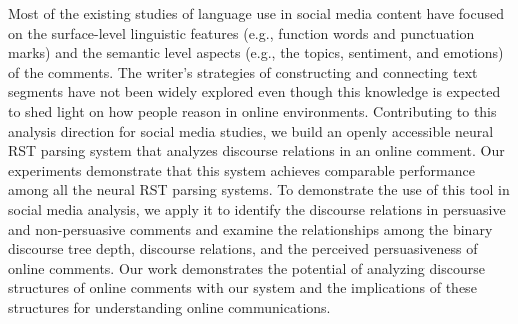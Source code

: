 Most of the existing studies of language use in social media content have focused on the surface-level linguistic features (e.g., function words and punctuation marks) and the semantic level aspects (e.g., the topics, sentiment, and emotions) of the comments. The writer's strategies of constructing and connecting text segments have not been widely explored even though this knowledge is expected to shed light on how people reason in online environments. Contributing to this analysis direction for social media studies, we build an openly accessible neural RST parsing system that analyzes discourse relations in an online comment. Our experiments demonstrate that this system achieves comparable performance among all the neural RST parsing systems. To demonstrate the use of this tool in social media analysis, we apply it to identify the discourse relations in persuasive and non-persuasive comments and examine the relationships among the binary discourse tree depth, discourse relations, and the perceived persuasiveness of online comments. Our work demonstrates the potential of analyzing discourse structures of online comments with our system and the implications of these structures for understanding online communications.
